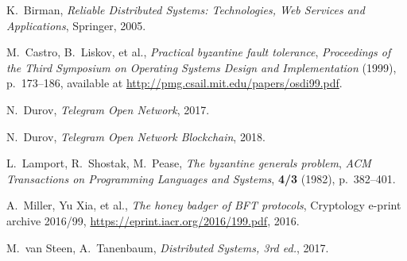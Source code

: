 \documentclass[12pt,oneside]{article}
\def\markbothsame#1{\fancyhead[C]{#1}}
\begin{document}
%
%
%
%

\clearpage
\markbothsame{\textsc{References}}

\begin{thebibliography}{2}
  {\sc K.~Birman}, {\sl Reliable Distributed Systems: Technologies, Web Services and Applications}, Springer, 2005.
  
  {\sc M.~Castro, B.~Liskov, et al.}, {\sl Practical byzantine fault tolerance}, {\it Proceedings of the Third Symposium on Operating Systems Design and Implementation\/} (1999), p.~173--186, available at \url{http://pmg.csail.mit.edu/papers/osdi99.pdf}.

  {\sc N.~Durov}, {\sl Telegram Open Network}, 2017.

  {\sc N.~Durov}, {\sl Telegram Open Network Blockchain}, 2018.

  {\sc L.~Lamport, R.~Shostak, M.~Pease}, {\sl The byzantine generals problem}, {\it ACM Transactions on Programming Languages and Systems}, {\bf 4/3} (1982), p.~382--401.

  {\sc A.~Miller, Yu Xia, et al.}, {\sl The honey badger of BFT protocols}, Cryptology e-print archive 2016/99, \url{https://eprint.iacr.org/2016/199.pdf}, 2016.

  {\sc M.~van Steen, A.~Tanenbaum}, {\sl Distributed Systems, 3rd ed.}, 2017.
\end{thebibliography}
\end{document}
